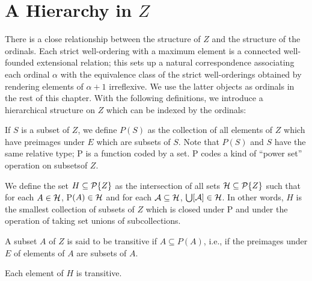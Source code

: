 \section[A Hierarchy in $Z$]{A Hierarchy in $Z$}

There is a close relationship between the structure of $Z$ and the
structure of the ordinals.  Each strict well-ordering
with a maximum element is a connected well-founded extensional
relation; this sets up 
a natural correspondence associating each ordinal $\alpha$ with the
equivalence class of the
strict well-orderings obtained by rendering  elements of $\alpha+1$
irreflexive.  We use the latter objects as 
ordinals in the rest of this chapter.  With the
following definitions, we introduce a hierarchical structure on $Z$ which can
be indexed by the ordinals:

\begin{definition}
 If $S$ is a subset of $Z$, we define $P(S)$ as the
 collection of all elements of $Z$ which have preimages under $E$
 which are subsets of $S$.  Note that $P(S)$ and $S$ have the same
 relative type; P is a function coded
 by a set.  P codes a kind of ``power set'' operation on
 subsets\linebreak of $Z$.
\end{definition}

\begin{definition}
 We define the set $H \subseteq {\cal P}\{Z\}$ as the
 intersection of all sets ${\cal H} \subseteq {\cal
 P}\{Z\}$ such that 
 for each $A \in {\cal H}$, P$(A) \in {\cal H}$ and for each ${\cal A}
 \subseteq {\cal H}$, $\bigcup[{\cal A}] \in {\cal H}$.  In other words,
 $H$ is the smallest collection of subsets of $Z$ which is closed
 under P and under the operation of taking set unions of
 subcollections.
\end{definition}

\begin{definition}
 A subset $A$ of $Z$ is said to be {\upshape
 transitive} if $A \subseteq  P(A)$, i.e., if the preimages
 under $E$ of elements of $A$ are subsets of $A$.
\end{definition}

\begin{lemme}
 Each element of $H$ is transitive.
\end{lemme}

